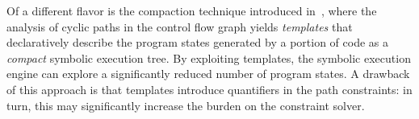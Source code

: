 
Of a different flavor is the compaction technique introduced in~\cite{SST-ATVA13}, where  the analysis of cyclic paths in the control flow graph yields {\em templates} that declaratively describe the program states generated by a portion of code as a {\em compact} symbolic execution tree. By exploiting templates, the symbolic execution engine can explore a significantly reduced number of program states. A drawback of this approach is that templates introduce quantifiers in the path constraints: in turn, this may significantly increase the burden on the constraint solver.

